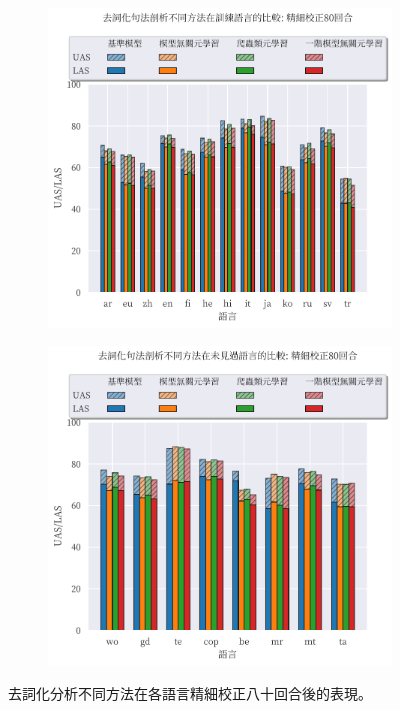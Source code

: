 \begin{figure}[!htbp]
    \centering
    \begin{subfigure}[t]{0.75\textwidth}
        \centering
        \includegraphics[width=\textwidth]{figs/chapter3/delex/bar_full_epoch_80_train_langs.pdf}
    \end{subfigure}
    \vspace{-12pt}
    \begin{subfigure}[t]{0.75\textwidth}
        \centering
        \includegraphics[width=\textwidth]{figs/chapter3/delex/bar_full_epoch_80_test_langs.pdf}
    \end{subfigure}
    \caption{去詞化分析不同方法在各語言精細校正八十回合後的表現。}
    \label{fig:bar_full_epoch_80}
\end{figure}